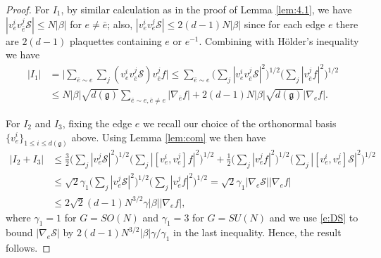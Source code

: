 \documentclass[11pt,UTF-8,reqno]{amsart}
\numberwithin{equation}{section}
\newcommand{\rmk}[1]{\textcolor{red}{#1}}
\def\tr{\mathrm {tr}}
\def\cS{{\mathcal S}}
\def\leq{\leqslant}
\def\le{\leqslant}
\def\tr{\mathrm {tr}}
\def\tr{{\rm Tr}}
\def\mfg{\mathfrak{g}}
\def\leq{\leqslant}
\def\le{\leqslant}
\def\dg{d(\mfg)}
\begin{document}
\begin{proof}
	For $I_1$, by similar calculation as in the proof of Lemma \ref{lem:4.1}, we have $|v_e^iv_{\bar e}^j\cS|\leq N|\beta|$ for $e\neq \bar e$;  also, $|v_e^iv_e^j\cS|\leq 2(d-1)N|\beta|$ since for each edge $e$ there are $2(d-1)$ plaquettes containing $e$ or $e^{-1}$. %
	Combining with H\"older's inequality we have
	\begin{align*}
		|I_1|
		&=
		\Big| \sum_{\bar e\sim e} \sum_j (v_e^iv_{\bar e}^j\cS)  v_{\bar e}^jf \Big|
		\leq \sum_{\bar e\sim e}\Big(\sum_j|v_e^iv_{\bar e}^j\cS|^2\Big)^{1/2}\Big(\sum_j|v_{\bar e}^jf|^2\Big)^{1/2}
		\\
		&\leq N|\beta| \sqrt{\dg} \sum_{\bar e\sim e,\bar e\neq e}|\nabla_{\bar e}f|+2(d-1)N|\beta| \sqrt{\dg} |\nabla_{ e}f|.
	\end{align*}
	
	
	
	
	
	For $I_2$ and $I_3$, fixing the edge $e$ we
recall our choice of the orthonormal basis $\{v_e^i\}_{1\le i\le \dg}$ above.
Using Lemma \ref{lem:com} we then have
	\begin{align*}
		|I_2+I_3|&\leq \frac32\Big(\sum_j |v_e^j\cS|^2\Big)^{1/2}\Big(\sum_j |[v_e^i,v_e^j]f|^2\Big)^{1/2}+\frac12\Big(\sum_j |v_e^jf|^2\Big)^{1/2}\Big(\sum_j |[v_e^i,v_e^j]\cS|^2\Big)^{1/2}\\
		 & \leq \sqrt 2 \gamma_1\Big(\sum_j |v_e^j\cS|^2\Big)^{1/2}\Big(\sum_j |v_e^jf|^2\Big)^{1/2}=\sqrt2\gamma_1|\nabla_e\cS||\nabla_ef|
		\\ & \leq 2\sqrt2(d-1)N^{3/2}\gamma|\beta||\nabla_ef|,
	\end{align*}
	where $\gamma_1=1$ for $G=SO(N)$ and $\gamma_1=3$ for $G=SU(N)$ and we use \eqref{e:DS} to bound $|\nabla_e\cS|$ by $2(d-1)N^{3/2}|\beta|\gamma/\gamma_1$ in the last inequality.
	Hence, the result follows.
\end{proof}

\end{document}

